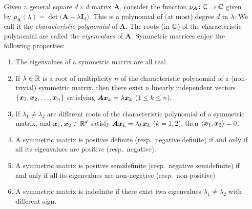 \begin{theorem}\label{theorem:eigenvalues}
Given a general square $d \times d$ matrix $\boldsymbol{A}$, consider the function $p_{\boldsymbol{A}} \colon \mathbb{C} \to \mathbb{C}$ given by $p_{\boldsymbol{A}}(\lambda) = \det\big(\boldsymbol{A} - \lambda \boldsymbol{I}_d \big)$.  This is a polynomial of (at most) degree $d$ in $\lambda$.  We call it the \emph{characteristic polynomial} of $\boldsymbol{A}$.  The roots (in $\mathbb{C}$) of the characteristic polynomial are called the \emph{eigenvalues} of $\boldsymbol{A}$.  Symmetric matrices enjoy the following properties:
\begin{enumerate}
	\item The eigenvalues of a symmetric matrix are all real.
	\item If $\lambda \in \mathbb{R}$ is a root  of multiplicity $n$ of the characteristic polynomial of a (non-trivial) symmetric matrix, then there exist $n$ linearly independent vectors $\{ \boldsymbol{x}_1, \boldsymbol{x}_2, \dotsc, \boldsymbol{x}_n \}$ satisfying $\boldsymbol{A} \boldsymbol{x}_k = \lambda \boldsymbol{x}_k$ ($1\leq k \leq n$).
	\item If $\lambda_1 \neq \lambda_2$ are different roots of the characteristic polynomial of a symmetric matrix, and $\boldsymbol{x}_1, \boldsymbol{x}_2 \in \mathbb{R}^d$ satisfy $\boldsymbol{A} \boldsymbol{x}_k = \lambda_k \boldsymbol{x}_k$ ($k=1,2$), then $\langle \boldsymbol{x}_1, \boldsymbol{x}_2 \rangle = 0$.
	\item A symmetric matrix is positive definite (resp.~negative definite) if and only if all its eigenvalues are positive (resp.~negative).
	\item A symmetric matrix is positive semidefinite (resp.~negative semidefinite) if and only if all its eigenvalues are non-negative (resp.~non-positive)
	\item A symmetric matrix is indefinite if there exist two eigenvalues $\lambda_1 \neq \lambda_2$ with different sign.
\end{enumerate}
\end{theorem}

